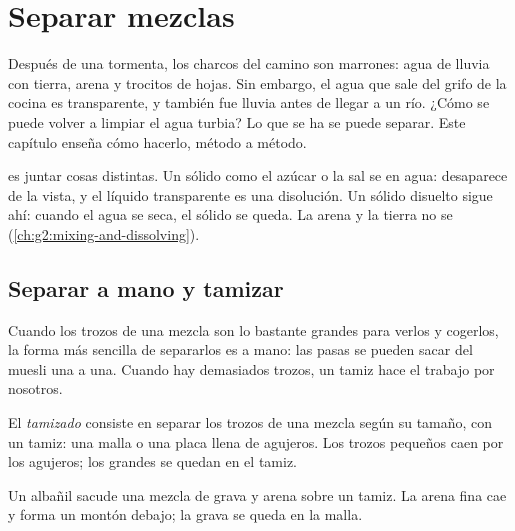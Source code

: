 \chapter{Separar mezclas}\label{ch:g3:separating-mixtures}

Después de una tormenta, los charcos del camino son marrones: agua de
lluvia  con tierra, arena y trocitos de hojas. Sin embargo, el
agua que sale del grifo de la cocina es transparente, y también fue
lluvia antes de llegar a un río. ¿Cómo se puede volver a limpiar el agua
turbia? Lo que se ha  se puede separar. Este capítulo enseña
cómo hacerlo, método a método.

\begin{recall}
 es juntar cosas distintas. Un sólido como el azúcar o la sal se
 en agua: desaparece de la vista, y el líquido transparente es
una disolución. Un sólido disuelto sigue ahí: cuando el agua se seca,
el sólido se queda. La arena y la tierra no se 
(\cref{ch:g2:mixing-and-dissolving}).
\end{recall}

\section{Separar a mano y tamizar}

Cuando los trozos de una mezcla son lo bastante grandes para verlos y
cogerlos, la forma más sencilla de separarlos es a mano: las pasas se
pueden sacar del muesli una a una. Cuando hay demasiados trozos, un
tamiz hace el trabajo por nosotros.

\begin{definition}[Tamizado]\label{def:g3:separating-mixtures:sieve}
El \emph{tamizado} consiste en separar los trozos de
una mezcla según su tamaño, con un tamiz: una malla o una placa llena
de agujeros. Los trozos pequeños caen por los agujeros; los grandes se
quedan en el tamiz.
\end{definition}

\begin{example}\label{ex:g3:separating-mixtures:gravel}
Un albañil sacude una mezcla de grava y arena sobre un tamiz. La arena
fina cae y forma un montón debajo; la grava se queda en la malla.
\end{example}

